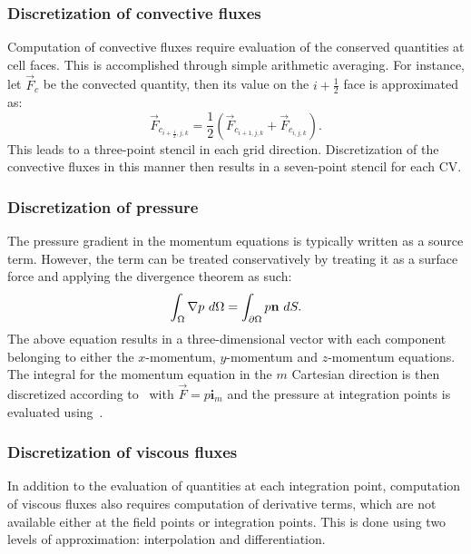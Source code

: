\subsubsection{Discretization of convective fluxes}
%
Computation of convective fluxes require evaluation of the conserved quantities at cell faces. This is accomplished through simple arithmetic averaging. For instance, let $\vec{F}_c$ be the convected quantity, then its value on the $i+\frac{1}{2}$ face is approximated as:
\begin{equation}
    \vec{F}_{c_{i+\frac{1}{2},j,k}} = \frac{1}{2}\left(
        \vec{F}_{c_{i+1,j,k}} + \vec{F}_{c_{i,j,k}}
    \right)
    \label{eq:synavg}.
\end{equation}
This leads to a three-point stencil in each grid direction. Discretization of the convective fluxes in this manner then results in a seven-point stencil for each CV.
%
\subsubsection{Discretization of pressure}
%
The pressure gradient in the momentum equations is typically written as a source term. However, the term can be treated conservatively by treating it as a surface force and applying the divergence theorem as such:
\begin{equation*}
    \int_\Omega \nabla p~d\Omega = \int_{\partial \Omega} p\mathbf{n}~dS.
\end{equation*}
The above equation results in a three-dimensional vector with each component belonging to either the $x$-momentum, $y$-momentum and $z$-momentum equations. The integral for the momentum equation in the $m$ Cartesian direction is then discretized according to~ with $\vec{F} = p \boldsymbol{i}_m$ and the pressure at integration points is evaluated using~.
%
\subsubsection{Discretization of viscous fluxes}
%
In addition to the evaluation of quantities at each integration point, computation of viscous fluxes also requires computation of derivative terms, which are not available either at the field points or integration points. This is done using two levels of approximation: interpolation and differentiation.

